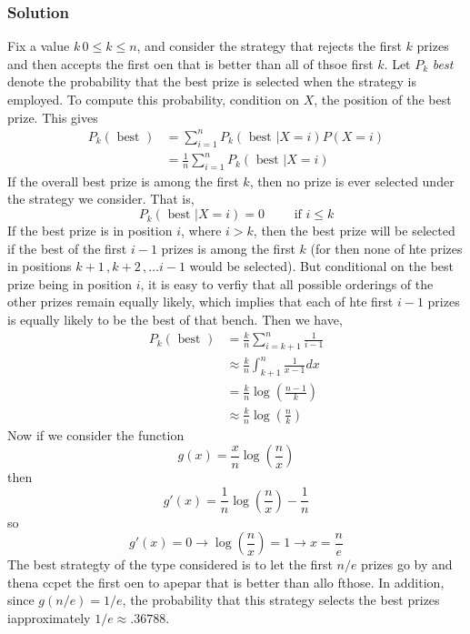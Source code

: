 \subsubsection*{Solution}
Fix a value $k\, 0\leq k\leq n$, and consider the strategy that rejects the first $k$ prizes and then accepts the first oen that is better than all of thsoe first $k$. Let $P_k$ \textit{best} denote the probability that the best prize is selected when the strategy is employed. To compute this probability, condition on $X$, the position of the best prize. This gives
\begin{equation*}
    \begin{split}
        P_k(\text{ best }) &= \sum^n_{i = 1} P_k (\text{ best } | X = i)P(X = i)\\
        &= \frac{1}{n} \sum^n_{i = 1} P_k (\text{ best } | X = i)
    \end{split}
\end{equation*}
If the overall best prize is among the first $k$, then no prize is ever selected under the strategy we consider. That is, 
\[P_k (\text{ best } | X = i) = 0\qquad \text{ if } i\leq k\]
If the best prize is in position $i$, where $i > k$, then the best prize will be selected if the best of the first $i - 1$ prizes is among the first $k$ (for then none of hte prizes in positions $k + 1\,, k + 2\,, \dots i - 1$ would be selected). But conditional on the best prize being in position $i$, it is easy to verfiy that all possible orderings of the other prizes remain equally likely, which implies that each of hte first $i - 1$ prizes is equally likely to be the best of that bench. Then we have, 
\begin{equation*}
    \begin{split}
        P_k(\text{ best }) &= \frac{k}{n} \sum^n_{i = k + 1} \frac{1}{i - 1}\\
        &\approx \frac{k}{n}\int^n_{k + 1} \frac{1}{x - 1} dx\\
        &= \frac{k}{n}\log\left(\frac{n-1}{k}\right)\\
        &\approx \frac{k}{n}\log\left(\frac{n}{k}\right)
    \end{split}
\end{equation*}
Now if we consider the function \[g(x) = \frac{x}{n}\log\left(\frac{n}{x}\right)\]
then \[g\prime(x) = \frac{1}{n}\log\left(\frac{n}{x}\right) - \frac{1}{n}\]
so \[g\prime(x) = 0\rightarrow\log\left(\frac{n}{x}\right) = 1\rightarrow \boxed{x = \frac{n}{e}}\]
The best strategty of the type considered is to let the first $n/e$ prizes go by and thena ccpet the first oen to apepar that is better than allo fthose. In addition, since $g(n/e) = 1/e$, the probability that this strategy selects the best prizes iapproximately $1/e\approx .36788$.  
